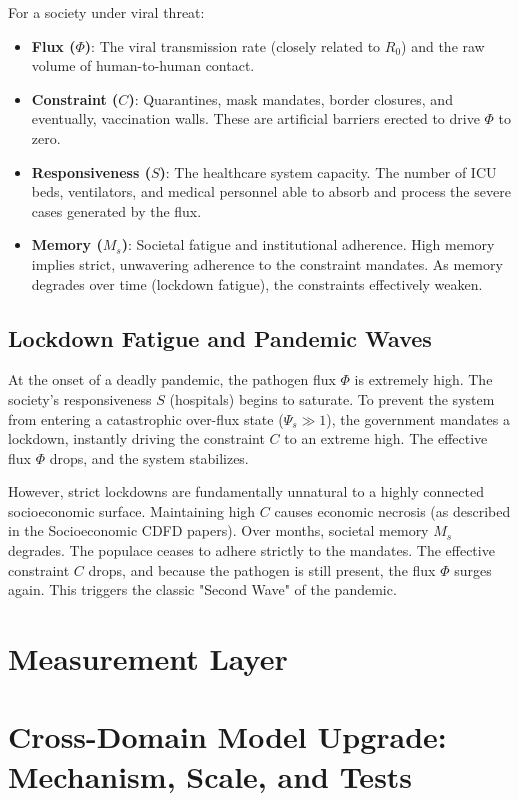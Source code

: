 \documentclass[11pt,a4paper]{article}
\begin{document}
For a society under viral threat:
\begin{itemize}
    \item \textbf{Flux ($\Phi$)}: The viral transmission rate (closely related to $R_0$) and the raw volume of human-to-human contact.
    \item \textbf{Constraint ($C$)}: Quarantines, mask mandates, border closures, and eventually, vaccination walls. These are artificial barriers erected to drive $\Phi$ to zero.
    \item \textbf{Responsiveness ($S$)}: The healthcare system capacity. The number of ICU beds, ventilators, and medical personnel able to absorb and process the severe cases generated by the flux.
    \item \textbf{Memory ($M_s$)}: Societal fatigue and institutional adherence. High memory implies strict, unwavering adherence to the constraint mandates. As memory degrades over time (lockdown fatigue), the constraints effectively weaken.
\end{itemize}

\subsection{Lockdown Fatigue and Pandemic Waves}
At the onset of a deadly pandemic, the pathogen flux $\Phi$ is extremely high. The society's responsiveness $S$ (hospitals) begins to saturate. To prevent the system from entering a catastrophic over-flux state ($\Psi_s \gg 1$), the government mandates a lockdown, instantly driving the constraint $C$ to an extreme high. The effective flux $\Phi$ drops, and the system stabilizes.

However, strict lockdowns are fundamentally unnatural to a highly connected socioeconomic surface. Maintaining high $C$ causes economic necrosis (as described in the Socioeconomic CDFD papers). Over months, societal memory $M_s$ degrades. The populace ceases to adhere strictly to the mandates. The effective constraint $C$ drops, and because the pathogen is still present, the flux $\Phi$ surges again. This triggers the classic "Second Wave" of the pandemic.



\section{Measurement Layer}

\section{Cross-Domain Model Upgrade: Mechanism, Scale, and Tests}
\end{document}
